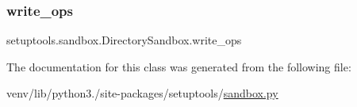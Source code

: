\subsubsection{\texorpdfstring{write\+\_\+ops}{write\_ops}}
{\footnotesize\ttfamily setuptools.\+sandbox.\+Directory\+Sandbox.\+write\+\_\+ops\hspace{0.3cm}{\ttfamily [static]}}



The documentation for this class was generated from the following file\+:\begin{DoxyCompactItemize}
\item 
venv/lib/python3./site-\/packages/setuptools/\hyperlink{sandbox_8py}{sandbox.\+py}\end{DoxyCompactItemize}
